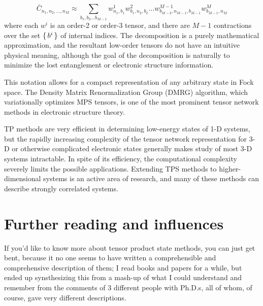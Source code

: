 \documentclass[11pt]{article} %
\begin{document}
\begin{equation}
    \bar{C}_{n_1,n_2,...,n_M} \approx \sum_{b_1,b_2...b_{M-1}}  w^{1}_{n_1,b_1} w^{2}_{b_1,n_2,b_2} \dots w^{M-1}_{b_{M-2},n_{M-1},b_{M-1}} w^{M}_{b_{M-1},n_M}
\end{equation}
where each $w^i$ is an order-2 or order-3 tensor, and there are $M-1$ contractions over the set 
$\set{b^i}$ of internal indices. The decomposition is a purely mathematical approximation,
and the resultant low-order tensors do not have an intuitive physical meaning, although the
goal of the decomposition is naturally to minimize the lost entanglement or electronic structure information. 

This notation allows for a compact representation of any arbitrary state in Fock space. 
The Density Matrix Renormalization Group (DMRG) algorithm, which variationally optimizes MPS tensors,
is one of the most prominent tensor network methods in electronic structure theory.
\supercite{white_density_1992, white_density-matrix_1993, white_ab_1999}

TP methods are very efficient in determining low-energy states of 1-D systems, but the
rapidly increasing complexity of the tensor network representation for 3-D or otherwise complicated
electronic states generally makes study of most 3-D systems intractable. \supercite{chan_density_2011} 
In spite of its efficiency, the
computational complexity severely limits the possible applications. 
Extending TPS methods to higher-dimensional systems is an active area of research,
and many of these methods can describe strongly correlated systems. 
\supercite{jordan_classical_2008, kovyrshin_self-adaptive_2017, marti_complete-graph_2010, murg_tree_2015, szalay_tensor_2015, nakatani_efficient_2013, abraham_selected_2020, abraham_cluster_2021}

\section{Further reading and influences}
If you'd like to know more about tensor product state methods, you can just get bent, because it no one seems to 
have written a comprehensible and comprehensive description of them; I read books and papers for a while,
but ended up synsthesizing this from a mash-up of what I could understand and remember from the comments of 
3 different people with Ph.D.s, all of whom, of course, gave very different descriptions. 

\printbibliography
\end{document}
